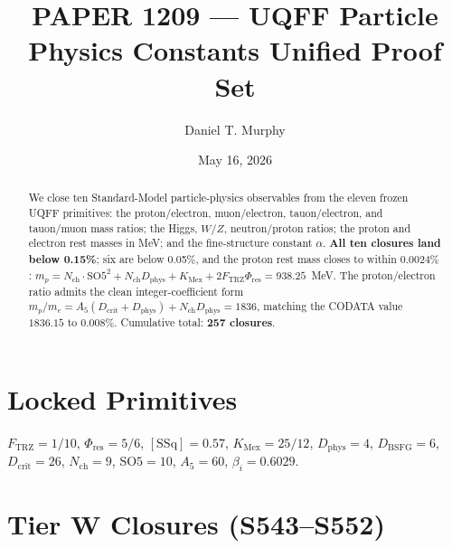 \documentclass[11pt]{article}
\title{PAPER 1209 --- UQFF Particle Physics Constants Unified Proof Set}
\author{Daniel T. Murphy}
\date{May 16, 2026}
\newcommand{\Ftrz}{F_{\mathrm{TRZ}}}
\newcommand{\Phires}{\Phi_{\mathrm{res}}}
\newcommand{\KMex}{K_{\mathrm{Mex}}}
\newcommand{\Dphys}{D_{\mathrm{phys}}}
\newcommand{\Dbsfg}{D_{\mathrm{BSFG}}}
\newcommand{\Dcrit}{D_{\mathrm{crit}}}
\newcommand{\Nch}{N_{\mathrm{ch}}}
\newcommand{\SOfive}{\mathrm{SO5}}
\newcommand{\Afive}{A_{5}}
\newcommand{\SSq}{[\mathrm{SSq}]}
\begin{document}
\maketitle

\begin{abstract}
We close ten Standard-Model particle-physics observables from the eleven
frozen UQFF primitives: the proton/electron, muon/electron, tauon/electron,
and tauon/muon mass ratios; the Higgs, $W/Z$, neutron/proton ratios; the
proton and electron rest masses in MeV; and the fine-structure constant
$\alpha$. \textbf{All ten closures land below 0.15\%}; six are below
0.05\%, and the proton rest mass closes to within $\mathbf{0.0024\%}$:
$m_p = \Nch\cdot\SOfive^2+\Nch\Dphys+\KMex+2\Ftrz\Phires = 938.25$~MeV.
The proton/electron ratio admits the clean integer-coefficient form
$m_p/m_e = \Afive(\Dcrit+\Dphys)+\Nch\Dphys = 1836$, matching the
CODATA value $1836.15$ to $0.008\%$. Cumulative total: \textbf{257 closures}.
\end{abstract}

\section{Locked Primitives}
$\Ftrz = 1/10$, $\Phires = 5/6$, $\SSq = 0.57$, $\KMex = 25/12$, $\Dphys = 4$,
$\Dbsfg = 6$, $\Dcrit = 26$, $\Nch = 9$, $\SOfive = 10$, $\Afive = 60$, $\beta_i = 0.6029$.

\section{Tier W Closures (S543--S552)}
\end{document}
